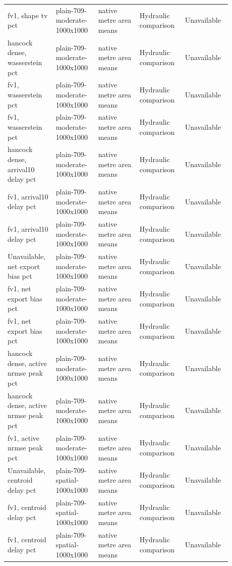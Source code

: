 \begin{longtable}{p{0.1760\linewidth}p{0.1760\linewidth}p{0.1760\linewidth}p{0.1760\linewidth}p{0.1760\linewidth}}
fv1, shape tv pct & plain-709-moderate-1000x1000 & native metre area means & Hydraulic comparison & Unavailable \\
hancock dense, wasserstein pct & plain-709-moderate-1000x1000 & native metre area means & Hydraulic comparison & Unavailable \\
fv1, wasserstein pct & plain-709-moderate-1000x1000 & native metre area means & Hydraulic comparison & Unavailable \\
fv1, wasserstein pct & plain-709-moderate-1000x1000 & native metre area means & Hydraulic comparison & Unavailable \\
hancock dense, arrival10 delay pct & plain-709-moderate-1000x1000 & native metre area means & Hydraulic comparison & Unavailable \\
fv1, arrival10 delay pct & plain-709-moderate-1000x1000 & native metre area means & Hydraulic comparison & Unavailable \\
fv1, arrival10 delay pct & plain-709-moderate-1000x1000 & native metre area means & Hydraulic comparison & Unavailable \\
Unavailable, net export bias pct & plain-709-moderate-1000x1000 & native metre area means & Hydraulic comparison & Unavailable \\
fv1, net export bias pct & plain-709-moderate-1000x1000 & native metre area means & Hydraulic comparison & Unavailable \\
fv1, net export bias pct & plain-709-moderate-1000x1000 & native metre area means & Hydraulic comparison & Unavailable \\
hancock dense, active nrmse peak pct & plain-709-moderate-1000x1000 & native metre area means & Hydraulic comparison & Unavailable \\
hancock dense, active nrmse peak pct & plain-709-moderate-1000x1000 & native metre area means & Hydraulic comparison & Unavailable \\
fv1, active nrmse peak pct & plain-709-moderate-1000x1000 & native metre area means & Hydraulic comparison & Unavailable \\
Unavailable, centroid delay pct & plain-709-spatial-1000x1000 & native metre area means & Hydraulic comparison & Unavailable \\
fv1, centroid delay pct & plain-709-spatial-1000x1000 & native metre area means & Hydraulic comparison & Unavailable \\
fv1, centroid delay pct & plain-709-spatial-1000x1000 & native metre area means & Hydraulic comparison & Unavailable \\

\end{longtable}
